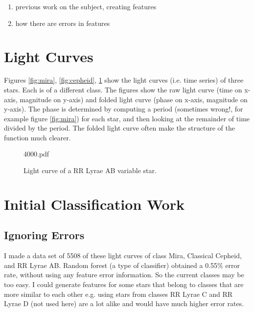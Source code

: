 \documentclass[11pt]{article}
\begin{document}
\begin{enumerate}
\item previous work on the subject, creating features
\item how there are errors in features
\end{enumerate}



\section{Light Curves}

Figures \ref{fig:mira}, \ref{fig:cepheid}, \ref{fig:rrlyrae} show the light curves (i.e. time series) of three stars. Each is of a different class. The figures show the raw light curve (time on x-axis, magnitude on y-axis) and folded light curve (phase on x-axis, magnitude on y-axis). The phase is determined by computing a period (sometimes wrong!, for example figure \ref{fig:mira}) for each star, and then looking at the remainder of time divided by the period. The folded light curve often make the structure of the function much clearer.





\begin{figure}[h]
  \begin{center}
    \begin{includegraphics}[scale=.5]{4000.pdf}
      \caption{Light curve of a RR Lyrae AB variable star.\label{fig:rrlyrae}}
    \end{includegraphics}
  \end{center}
\end{figure}



\section{Initial Classification Work}

\subsection{Ignoring Errors}
I made a data set of 5508 of these light curves of class Mira, Classical Cepheid, and RR Lyrae AB. Random forest (a type of classifier) obtained a 0.55\% error rate, without using any feature error information. So the current classes may be too easy. I could generate features for some stars that belong to classes that are more similar to each other e.g. using stars from classes RR Lyrae C and RR Lyrae D (not used here) are a lot alike and would have much higher error rates.
\end{document}
